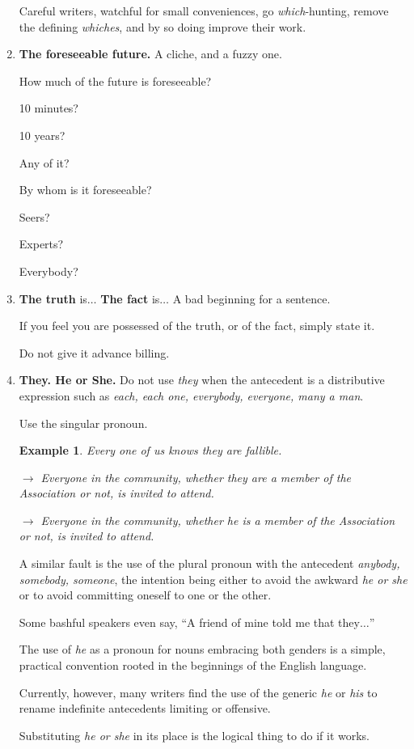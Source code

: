 \documentclass{article}
\newtheorem{example}{Example}
\begin{document}
\begin{enumerate}
	Careful writers, watchful for small conveniences, go {\it which}-hunting, remove the defining {\it whiches}, and by so doing improve their work.
	\item {\bf The foreseeable future.} A cliche, and a fuzzy one.
	
	How much of the future is foreseeable?
	
	10 minutes?
	
	10 years?
	
	Any of it?
	
	By whom is it foreseeable?
	
	Seers?
	
	Experts?
	
	Everybody?
	\item {\bf The truth} is$\ldots$ {\bf The fact} is$\ldots$ A bad beginning for a sentence.
	
	If you feel you are possessed of the truth, or of the fact, simply state it.
	
	Do not give it advance billing.
	\item {\bf They. He or She.} Do not use {\it they} when the antecedent is a distributive expression such as {\it each, each one, everybody, everyone, many a man}.
	
	Use the singular pronoun.
	\begin{example}
		Every one of us knows they are fallible.
		
		$\to$ Everyone in the community, whether they are a member of the Association or not, is invited to attend.
		
		$\to$ Everyone in the community, whether he is a member of the Association or not, is invited to attend.
	\end{example}
	A similar fault is the use of the plural pronoun with the antecedent {\it anybody, somebody, someone}, the intention being either to avoid the awkward {\it he or she} or to avoid committing oneself to one or the other.
	
	Some bashful speakers even say, ``A friend of mine told me that they$\ldots$''
	
	The use of {\it he} as a pronoun for nouns embracing both genders is a simple, practical convention rooted in the beginnings of the English language.
	
	Currently, however, many writers find the use of the generic {\it he} or {\it his} to rename indefinite antecedents limiting or offensive.
	
	Substituting {\it he or she} in its place is the logical thing to do if it works.
	

\end{enumerate}
\end{document}
